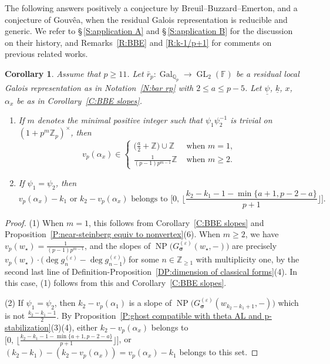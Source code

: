 \documentclass[12pt]{amsart}
\newtheorem{corollary}[subsection]{Corollary}
\theoremstyle{definition}
\numberwithin{equation}{subsection}
\def\FF{\mathbb{F}}
\def\QQ{\mathbb{Q}}
\def\ZZ{\mathbb{Z}}
\DeclareMathOperator{\Gal}{Gal}
\DeclareMathOperator{\GL}{GL}
\DeclareMathOperator{\NP}{NP}
\newcommand{\bbsigma}{\boldsymbol{\sigma}}
\begin{document}
The following answers positively a conjecture by Breuil--Buzzard--Emerton, and a conjecture of Gouv\^ea, when the residual Galois representation is reducible and generic. We refer to \S\,\ref{S:application A} and \S\,\ref{S:application B} for the discussion on their history, and Remarks~\ref{R:BBE} and \ref{R:k-1/p+1} for comments on previous related works.
\begin{corollary}
\label{C:BBE and gouvea k-1/p+1}
Assume that $p\geq 11$.
Let $\bar r_p: \Gal_{\QQ_p} \to \GL_2(\FF)$ be a residual local Galois representation as in Notation~\ref{N:bar rp} with $2 \leq a \leq p-5$. Let $\underline \psi$, $\underline k$, $x$, $\alpha_x$ be as in Corollary~\ref{C:BBE slopes}.  
\begin{enumerate}
\item 
If
$m$ denotes the minimal \emph{positive} integer such that $\psi_1\psi_2^{-1}$ is trivial on $(1+p^m\ZZ_p)^\times$, then
$$
v_p(\alpha_x) \in \begin{cases}
\big(\frac a2+\ZZ\big)\cup \ZZ & \textrm{ when }m=1,
\\ \frac{1}{(p-1)p^{m-1}} \ZZ & \textrm{ when }m \geq 2.
\end{cases}
$$
\item If $\psi_1 = \psi_2$, then 
$$v_p(\alpha_x) - k_1 \textrm{ or } k_2-v_p(\alpha_x) \textrm{ belongs to } \bigg[0,\, \Big\lfloor\frac{k_2-k_1-1-\min\{a+1, p-2-a\}}{p+1}\Big\rfloor \bigg].$$
\end{enumerate}
\end{corollary}
\begin{proof}
(1)
When $m=1$, this follows from Corollary~\ref{C:BBE slopes} 
and Proposition~\ref{P:near-steinberg equiv to nonvertex}(6). 
When $m\geq 2$, we have $v_p(w_\star) = \frac 1{(p-1)p^{m-1}}$, and the slopes of $\NP\big(G^{(\varepsilon)}_{\bbsigma}(w_{\star},-)\big)$ are precisely $v_p(w_\star) \cdot \big(\deg g_n^{(\varepsilon)} - \deg g_{n-1}^{(\varepsilon)} \big)$ for some $n \in \ZZ_{\geq 1}$ with multiplicity one, by the second last line of Definition-Proposition~\ref{DP:dimension of classical forms}(4). In this case, (1) follows from this and Corollary~\ref{C:BBE slopes}.

(2) If $\psi_1=\psi_2$, then $k_2-v_p(\alpha_1)$ is a slope of $\NP\big(G_{\bbsigma}^{(\varepsilon)}(w_{k_2-k_1+1}, -)\big)$ which is not $\frac{k_2-k_1-1}2$. By Proposition~\ref{P:ghost compatible with theta AL and p-stabilization}(3)(4), either $k_2 -v_p(\alpha_x)$ belongs to $\big[0,\, \big\lfloor\frac{k_2-k_1-1-\min\{a+1, p-2-a\}}{p+1}\big\rfloor \big]$, or $(k_2-k_1)-(k_2-v_p(\alpha_x)) = v_p(\alpha_x)-k_1$ belongs to this set.
\end{proof}
\end{document}
